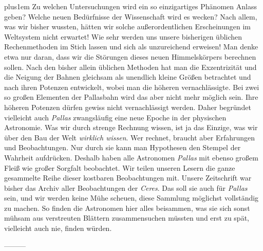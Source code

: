 \begingroup\rightskip=0pt plus1em\relax
Zu welchen Untersuchungen wird ein so einzigartiges Phänomen Anlass geben? Welche neuen Bedürfnisse der Wissenschaft wird es wecken? Nach allem, was wir bisher wussten, hätten wir solche außerordentlichen Erscheinungen im Weltsystem nicht erwartet! Wie sehr werden uns unsere bisherigen üblichen Rechenmethoden im Stich lassen und sich als unzureichend erweisen! Man denke etwa nur daran, dass wir die Störungen dieses neuen Himmelskörpers berechnen sollen. Nach den bisher allein üblichen Methoden hat man die Exzentrizität und die Neigung der Bahnen gleichsam als unendlich kleine Größen betrachtet und nach ihren Potenzen entwickelt, wobei man die höheren vernachlässigte. Bei zwei so großen Elementen der Pallasbahn wird das aber nicht mehr möglich sein. Ihre höheren Potenzen dürfen gewiss nicht vernachlässigt werden. Daher begründet vielleicht auch \textit{Pallas} zwangsläufig eine neue Epoche in der physischen Astronomie. Was wir durch strenge Rechnung wissen, ist ja das Einzige, was wir über den Bau der Welt \textit{wirklich wissen}. Wer rechnet, braucht aber Erfahrungen und Beobachtungen. Nur durch sie kann man Hypothesen den Stempel der Wahrheit aufdrücken. Deshalb haben alle Astronomen \textit{Pallas} mit ebenso großem Fleiß wie großer Sorgfalt beobachtet. Wir teilen unseren Lesern die ganze gesammelte Reihe dieser kostbaren Beobachtungen mit. Unsere Zeitschrift war bisher das Archiv aller Beobachtungen der \textit{Ceres}. Das soll sie auch für \textit{Pallas} sein, und wir werden keine Mühe scheuen, diese Sammlung möglichst vollständig zu machen. So finden die Astronomen hier alles beisammen, was sie sich sonst mühsam aus verstreuten Blättern zusammensuchen müssten und erst zu spät, vielleicht auch nie, finden würden.\par\endgroup

—\quad —\quad —

